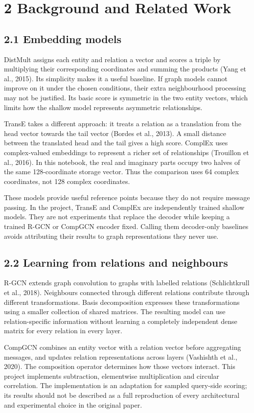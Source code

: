 \documentclass[11pt]{article}
\begin{document}
\section*{2 Background and Related Work}
\subsection*{2.1 Embedding models}
DistMult assigns each entity and relation a vector and scores a triple by multiplying their corresponding coordinates and summing the products (Yang et al., 2015). Its simplicity makes it a useful baseline. If graph models cannot improve on it under the chosen conditions, their extra neighbourhood processing may not be justified. Its basic score is symmetric in the two entity vectors, which limits how the shallow model represents asymmetric relationships.

TransE takes a different approach: it treats a relation as a translation from the head vector towards the tail vector (Bordes et al., 2013). A small distance between the translated head and the tail gives a high score. ComplEx uses complex-valued embeddings to represent a richer set of relationships (Trouillon et al., 2016). In this notebook, the real and imaginary parts occupy two halves of the same 128-coordinate storage vector. Thus the comparison uses 64 complex coordinates, not 128 complex coordinates.

These models provide useful reference points because they do not require message passing. In the project, TransE and ComplEx are independently trained shallow models. They are not experiments that replace the decoder while keeping a trained R-GCN or CompGCN encoder fixed. Calling them decoder-only baselines avoids attributing their results to graph representations they never use.

\subsection*{2.2 Learning from relations and neighbours}
R-GCN extends graph convolution to graphs with labelled relations (Schlichtkrull et al., 2018). Neighbours connected through different relations contribute through different transformations. Basis decomposition expresses these transformations using a smaller collection of shared matrices. The resulting model can use relation-specific information without learning a completely independent dense matrix for every relation in every layer.

CompGCN combines an entity vector with a relation vector before aggregating messages, and updates relation representations across layers (Vashishth et al., 2020). The composition operator determines how those vectors interact. This project implements subtraction, elementwise multiplication and circular correlation. The implementation is an adaptation for sampled query-side scoring; its results should not be described as a full reproduction of every architectural and experimental choice in the original paper.
\end{document}
